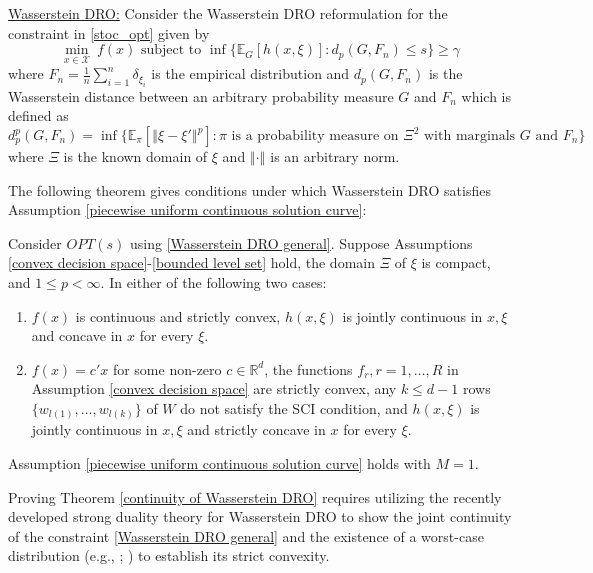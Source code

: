 \documentclass[mnsc,blindrev]{informs4} %
\newcommand{\R}{\mathbb{R}}
\newcommand{\norm}[1]{\left \Vert #1 \right\Vert}
\begin{document}
\smallskip


\noindent\underline{Wasserstein DRO:}
Consider the Wasserstein DRO reformulation for the constraint in \eqref{stoc_opt} given by
\begin{equation}\label{Wasserstein DRO general}
\min_{x\in\mathcal X}\ f(x)\text{\ \ subject to\ \ }\inf\Big\{\mathbb E_{G}[h(x,\xi)]:d_p(G,F_n )\leq s\Big\}\geq \gamma
\end{equation}
where $F_n=\frac{1}{n}\sum_{i=1}^n\delta_{\xi_i}$ is the empirical distribution and $d_p(G,F_n)$ is the Wasserstein distance between an arbitrary probability measure $G$ and $F_n$ which is defined as
\begin{equation*}
d_p^p(G,F_n)=\inf\Big\{\mathbb E_{\pi}[\norm{\xi-\xi'}^p]:\pi\text{ is a probability measure on }\Xi^2\text{ with marginals }G\text{ and }F_n\Big\}
\end{equation*}
where $\Xi$ is the known domain of $\xi$ and $\norm{\cdot}$ is an arbitrary norm.

The following theorem gives conditions under which Wasserstein DRO satisfies Assumption \ref{piecewise uniform continuous solution curve}:
\begin{theorem}\label{continuity of Wasserstein DRO}
Consider $OPT(s)$ using \eqref{Wasserstein DRO general}. Suppose Assumptions \ref{convex decision space}-\ref{bounded level set} hold, the domain $\Xi$ of $\xi$ is compact, and $1\leq p<\infty$. In either of the following two cases:
\begin{enumerate}
\item[i.]$f(x)$ is continuous and strictly convex, $h(x,\xi)$ is jointly continuous in $x,\xi$ and concave in $x$ for every $\xi$.
\item[ii.]$f(x)=c'x$ for some non-zero $c\in\R^d$, the functions $f_r,r=1,\ldots,R$ in Assumption \ref{convex decision space} are strictly convex, any $k\leq d-1$ rows $\{w_{l(1)},\ldots,w_{l(k)}\}$ of $W$ do not satisfy the SCI condition, and $h(x,\xi)$ is jointly continuous in $x,\xi$ and strictly concave in $x$ for every $\xi$.
\end{enumerate}
Assumption \ref{piecewise uniform continuous solution curve} holds with $M=1$.
\end{theorem}
Proving Theorem \ref{continuity of Wasserstein DRO} requires utilizing the recently developed strong duality theory for Wasserstein DRO to show the joint continuity of the constraint \eqref{Wasserstein DRO general} and the existence of a worst-case distribution (e.g., \cite{blanchet2019quantifying}; \cite{gao2016distributionally}) to establish its strict convexity.
\end{document}

